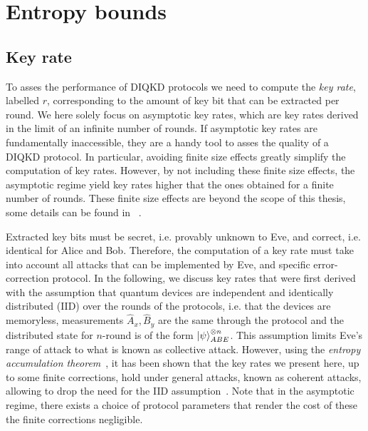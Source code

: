 \chapter{Entropy bounds}
\label{chap:entropybound}

\section{Key rate}

To asses the performance of DIQKD protocols we need to compute the \textit{key rate}, labelled $r$, corresponding to the amount of key bit that can be extracted per round.
We here solely focus on asymptotic key rates, which are key rates derived in the limit of an infinite number of rounds.
If asymptotic key rates are fundamentally inaccessible, they are a handy tool to asses the quality of a DIQKD protocol.
In particular, avoiding finite size effects greatly simplify the computation of key rates.
However, by not including these finite size effects, the asymptotic regime yield key rates higher that the ones obtained for a finite number of rounds.
These finite size effects are beyond the scope of this thesis, some details can be found in ~\cite{Tan2021,Tan2022,Primaatmaja2023}.

Extracted key bits must be secret, i.e. provably unknown to Eve, and correct, i.e. identical for Alice and Bob.
Therefore, the computation of a key rate must take into account all attacks that can be implemented by Eve, and specific error-correction protocol.
In the following, we discuss key rates that were first derived with the assumption that quantum devices are independent and identically distributed (IID) over the rounds of the protocols, i.e. that the devices are memoryless, measurements $\hat{A}_x,\hat{B}_y$ are the same through the protocol and the distributed state for $n$-round is of the form $\ket{\psi}_{ABE}^{\otimes n}$.
This assumption limits Eve's range of attack to what is known as collective attack.
However, using the \textit{entropy accumulation theorem}~\cite{Dupuis2019,Dupuis2020}, it has been shown that the key rates we present here, up to some finite corrections, hold under general attacks, known as coherent attacks, allowing to drop the need for the IID assumption~\cite{ArnonFriedman2019}.
Note that in the asymptotic regime, there exists a choice of protocol parameters that render the cost of these the finite corrections negligible.


\medbreak

